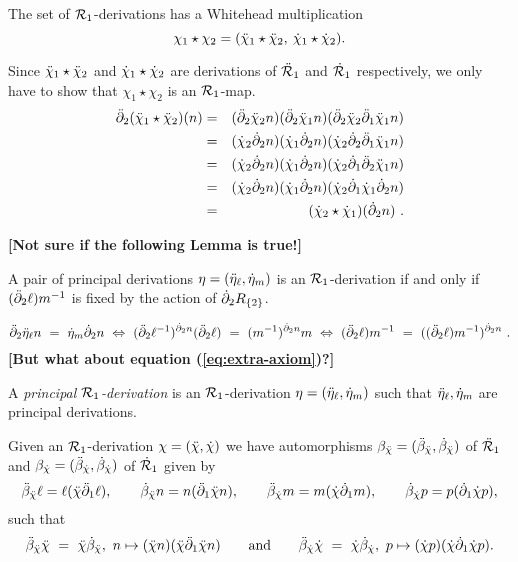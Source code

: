 \begin{lem}
The set of $\mathcal{R}_1$-derivations has a Whitehead multiplication 
$$ 
\chi_1 \star  \chi_2 = (\ddot{\chi}_1 \star  \ddot{\chi}_2, \: \dot{\chi}_1 \star  \dot{\chi}_2).
$$
\end{lem}
\begin{pf}
Since $\ddot{\chi}_1 \star \ddot{\chi}_2$ and $\dot{\chi}_1 \star \dot{\chi}_2$ are derivations of 
$\ddot{\mathcal{R}}_1$ and $\dot{\mathcal{R}}_1$ respectively, 
we only have to show that $\chi_1 \star \chi_2$ is an $\mathcal{R}_1$-map.
\begin{eqnarray*}
\ddot{\partial}_2 (\ddot{\chi}_1 \star \ddot{\chi}_2)(n)  
  & = & (\ddot{\partial}_2 \ddot{\chi}_2 n) (\ddot{\partial}_2 \ddot{\chi}_1 n) 
         (\ddot{\partial}_2 \ddot{\chi}_2 \ddot{\partial}_1 \ddot{\chi}_1 n) \\
  & = & (\dot{\chi}_2 \dot{\partial}_2 n) (\dot{\chi}_1 \dot{\partial}_2 n) 
         (\dot{\chi}_2 \dot{\partial}_2 \ddot{\partial}_1 \ddot{\chi}_1 n) \\
  & = & (\dot{\chi}_2 \dot{\partial}_2 n) (\dot{\chi}_1 \dot{\partial}_2 n) 
         (\dot{\chi}_2 \dot{\partial}_1 \ddot{\partial}_2 \ddot{\chi}_1 n) \\
  & = & (\dot{\chi}_2 \dot{\partial}_2 n) (\dot{\chi}_1 \dot{\partial}_2 n) 
         (\dot{\chi}_2 \dot{\partial}_1 \dot{\chi}_1 \dot{\partial}_2 n) \\
  & = & (\dot{\chi}_2 \star \dot{\chi}_1)(\dot{\partial}_2 n)~.
\end{eqnarray*}
\end{pf}

\newpage 
\noindent
{\bf [Not sure if the following Lemma is true!]}
\vspace{3mm}

\begin{lem}
A pair of principal derivations $\eta = ( \ddot{\eta}_{\ell}, \dot{\eta}_m)$ 
is an $\mathcal{R}_1$-derivation if and only if 
$(\ddot{\partial}_2\ell)m^{-1}$  is fixed by the action of  $\dot{\partial}_2 R_{\{2\}}$.
\end{lem}
\begin{pf}
$$
\ddot{\partial}_2 \ddot{\eta}_{\ell} n ~=~ \dot{\eta}_{m} \dot{\partial}_2 n
~\Leftrightarrow~
(\ddot{\partial}_2 \ell^{-1})^{\dot{\partial}_2 n} (\ddot{\partial}_2 \ell) ~=~ (m^{-1})^{\dot{\partial}_2 n} m 
~\Leftrightarrow~
(\ddot{\partial}_2\ell)m^{-1} ~=~ ((\ddot{\partial}_2\ell)m^{-1})^{\dot{\partial}_2 n}~.
$$
{\bf [But what about equation (\ref{eq:extra-axiom})?]}
\end{pf}

\bigskip
\begin{defn}  
A \emph{principal $\mathcal{R}_1$-derivation} is an $\mathcal{R}_1$-derivation 
$\eta = ( \ddot{\eta}_{\ell}, \dot{\eta}_m)$ such that $\ddot{\eta}_{\ell}, \dot{\eta}_m$ 
are principal derivations.
\end{defn}

\medskip
Given an $\mathcal{R}_1$-derivation $\chi = (\ddot{\chi},\dot{\chi})$ 
we have automorphisms
$\beta_{\ddot{\chi}} = (\ddot{\beta}_{\ddot{\chi}},\dot{\beta}_{\ddot{\chi}})$  of  $\ddot{\mathcal{R}}_1$ 
and
$\beta_{\dot{\chi}} = (\ddot{\beta}_{\dot{\chi}},\dot{\beta}_{\dot{\chi}})$  of  $\dot{\mathcal{R}}_1$ 
given by
$$ 
\ddot{\beta}_{\ddot{\chi}} \ell = \ell(\ddot{\chi} \ddot{\partial}_1 \ell), \qquad
    \dot{\beta}_{\ddot{\chi}} n = n(\ddot{\partial}_1 \ddot{\chi} n),  \qquad
    \ddot{\beta}_{\dot{\chi}} m = m(\dot{\chi} \dot{\partial}_1 m),  \qquad
     \dot{\beta}_{\dot{\chi}} p = p(\dot{\partial}_1 \dot{\chi} p), 
$$
such that
$$
\ddot{\beta}_{\ddot{\chi}} \ddot{\chi} ~=~ \ddot{\chi} \dot{\beta}_{\ddot{\chi}},~ 
n \mapsto (\ddot{\chi} n)(\ddot{\chi} \ddot{\partial}_1 \ddot{\chi} n)
\qquad\mbox{and}\qquad
\ddot{\beta}_{\dot{\chi}} \dot{\chi} ~=~ \dot{\chi} \dot{\beta}_{\dot{\chi}},~
p \mapsto (\dot{\chi} p)(\dot{\chi} \dot{\partial}_1 \dot{\chi} p).
$$

